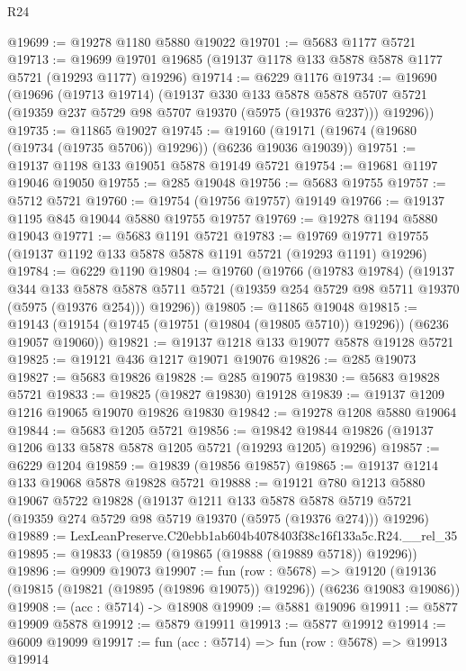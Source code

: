 \begin{lexlean}{R24}
\begin{coremodule}
@19699 := @19278 @1180 @5880 @19022
@19701 := @5683 @1177 @5721
@19713 := @19699 @19701 @19685 (@19137 @1178 @133 @5878 @5878 @1177 @5721 (@19293 @1177) @19296)
@19714 := @6229 @1176
@19734 := @19690
    (@19696
      (@19713 @19714)
      (@19137
        @330
        @133
        @5878
        @5878
        @5707
        @5721
        (@19359 @237 @5729 @98 @5707 @19370 (@5975 (@19376 @237)))
        @19296))
@19735 := @11865 @19027
@19745 := @19160 (@19171 (@19674 (@19680 (@19734 (@19735 @5706)) @19296)) (@6236 @19036 @19039))
@19751 := @19137 @1198 @133 @19051 @5878 @19149 @5721
@19754 := @19681 @1197 @19046 @19050
@19755 := @285 @19048
@19756 := @5683 @19755
@19757 := @5712 @5721
@19760 := @19754 (@19756 @19757) @19149
@19766 := @19137 @1195 @845 @19044 @5880 @19755 @19757
@19769 := @19278 @1194 @5880 @19043
@19771 := @5683 @1191 @5721
@19783 := @19769 @19771 @19755 (@19137 @1192 @133 @5878 @5878 @1191 @5721 (@19293 @1191) @19296)
@19784 := @6229 @1190
@19804 := @19760
    (@19766
      (@19783 @19784)
      (@19137
        @344
        @133
        @5878
        @5878
        @5711
        @5721
        (@19359 @254 @5729 @98 @5711 @19370 (@5975 (@19376 @254)))
        @19296))
@19805 := @11865 @19048
@19815 := @19143 (@19154 (@19745 (@19751 (@19804 (@19805 @5710)) @19296)) (@6236 @19057 @19060))
@19821 := @19137 @1218 @133 @19077 @5878 @19128 @5721
@19825 := @19121 @436 @1217 @19071 @19076
@19826 := @285 @19073
@19827 := @5683 @19826
@19828 := @285 @19075
@19830 := @5683 @19828 @5721
@19833 := @19825 (@19827 @19830) @19128
@19839 := @19137 @1209 @1216 @19065 @19070 @19826 @19830
@19842 := @19278 @1208 @5880 @19064
@19844 := @5683 @1205 @5721
@19856 := @19842 @19844 @19826 (@19137 @1206 @133 @5878 @5878 @1205 @5721 (@19293 @1205) @19296)
@19857 := @6229 @1204
@19859 := @19839 (@19856 @19857)
@19865 := @19137 @1214 @133 @19068 @5878 @19828 @5721
@19888 := @19121
    @780
    @1213
    @5880
    @19067
    @5722
    @19828
    (@19137
      @1211
      @133
      @5878
      @5878
      @5719
      @5721
      (@19359 @274 @5729 @98 @5719 @19370 (@5975 (@19376 @274)))
      @19296)
@19889 := LexLeanPreserve.C20ebb1ab604b4078403f38c16f133a5c.R24.__rel_35
@19895 := @19833 (@19859 (@19865 (@19888 (@19889 @5718)) @19296))
@19896 := @9909 @19073
@19907 := fun (row : @5678) =>
  @19120 (@19136 (@19815 (@19821 (@19895 (@19896 @19075)) @19296)) (@6236 @19083 @19086))
@19908 := (acc : @5714) -> @18908
@19909 := @5881 @19096
@19911 := @5877 @19909 @5878
@19912 := @5879 @19911
@19913 := @5877 @19912
@19914 := @6009 @19099
@19917 := fun (acc : @5714) => fun (row : @5678) => @19913 @19914

\end{coremodule}
\end{lexlean}
